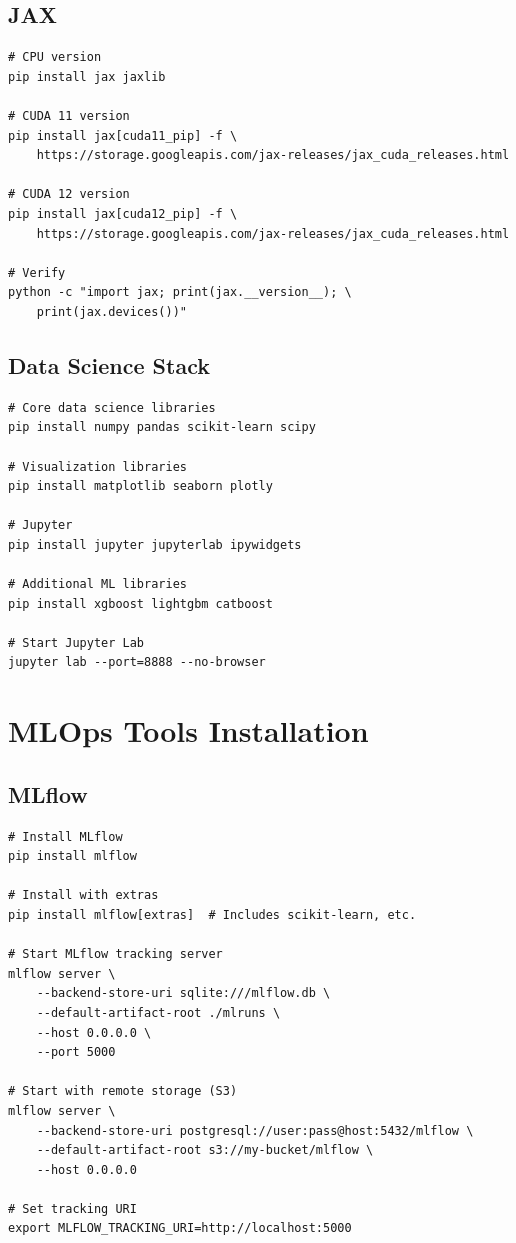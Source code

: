\subsection{JAX}

\begin{lstlisting}[style=shell]
# CPU version
pip install jax jaxlib

# CUDA 11 version
pip install jax[cuda11_pip] -f \
    https://storage.googleapis.com/jax-releases/jax_cuda_releases.html

# CUDA 12 version
pip install jax[cuda12_pip] -f \
    https://storage.googleapis.com/jax-releases/jax_cuda_releases.html

# Verify
python -c "import jax; print(jax.__version__); \
    print(jax.devices())"
\end{lstlisting}

\subsection{Data Science Stack}

\begin{lstlisting}[style=shell]
# Core data science libraries
pip install numpy pandas scikit-learn scipy

# Visualization libraries
pip install matplotlib seaborn plotly

# Jupyter
pip install jupyter jupyterlab ipywidgets

# Additional ML libraries
pip install xgboost lightgbm catboost

# Start Jupyter Lab
jupyter lab --port=8888 --no-browser
\end{lstlisting}

\section{MLOps Tools Installation}

\subsection{MLflow}

\begin{lstlisting}[style=shell]
# Install MLflow
pip install mlflow

# Install with extras
pip install mlflow[extras]  # Includes scikit-learn, etc.

# Start MLflow tracking server
mlflow server \
    --backend-store-uri sqlite:///mlflow.db \
    --default-artifact-root ./mlruns \
    --host 0.0.0.0 \
    --port 5000

# Start with remote storage (S3)
mlflow server \
    --backend-store-uri postgresql://user:pass@host:5432/mlflow \
    --default-artifact-root s3://my-bucket/mlflow \
    --host 0.0.0.0

# Set tracking URI
export MLFLOW_TRACKING_URI=http://localhost:5000
\end{lstlisting}

